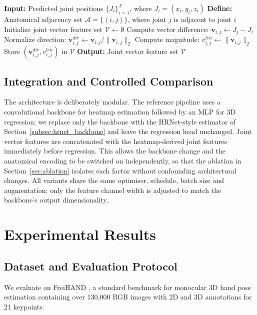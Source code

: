 \begin{algorithm}[H]
\footnotesize
\caption{Computation of Joint Vector Feature}
\label{alg:joint_vector_feature}
\begin{algorithmic}[1]
\STATE \textbf{Input:} Predicted joint positions $\{J_i\}_{i=1}^{J}$, where $J_i = (x_i, y_i, z_i)$
\STATE \textbf{Define:} Anatomical adjacency set $\mathcal{A} = \{(i, j)\}$, where joint $j$ is adjacent to joint $i$
\STATE Initialize joint vector feature set $\mathcal{V} \gets \emptyset$
    \STATE Compute vector difference: $\mathbf{v}_{i,j} \gets J_j - J_i$
    \STATE Normalize direction: $\mathbf{v}^{dir}_{i,j} \gets \mathbf{v}_{i,j} / \|\mathbf{v}_{i,j}\|_2$
    \STATE Compute magnitude: $v^{len}_{i,j} \gets \|\mathbf{v}_{i,j}\|_2$
    \STATE Store $(\mathbf{v}^{dir}_{i,j}, v^{len}_{i,j})$ in $\mathcal{V}$
\ENDFOR
\STATE \textbf{Output:} Joint vector feature set $\mathcal{V}$
\end{algorithmic}
\end{algorithm}

\subsection{Integration and Controlled Comparison}
The architecture is deliberately modular. The reference pipeline uses a convolutional backbone for heatmap estimation followed by an MLP for 3D regression; we replace only the backbone with the HRNet-style estimator of Section~\ref{subsec:hrnet_backbone} and leave the regression head unchanged. Joint vector features are concatenated with the heatmap-derived joint features immediately before regression. This allows the backbone change and the anatomical encoding to be switched on independently, so that the ablation in Section~\ref{sec:ablation} isolates each factor without confounding architectural changes. All variants share the same optimiser, schedule, batch size and augmentation; only the feature channel width is adjusted to match the backbone's output dimensionality.

\section{Experimental Results}

\subsection{Dataset and Evaluation Protocol}
\label{subsec:setup}
We evaluate on FreiHAND \cite{zimmermann2019freihand}, a standard benchmark for monocular 3D hand pose estimation containing over 130{,}000 RGB images with 2D and 3D annotations for 21 keypoints.

